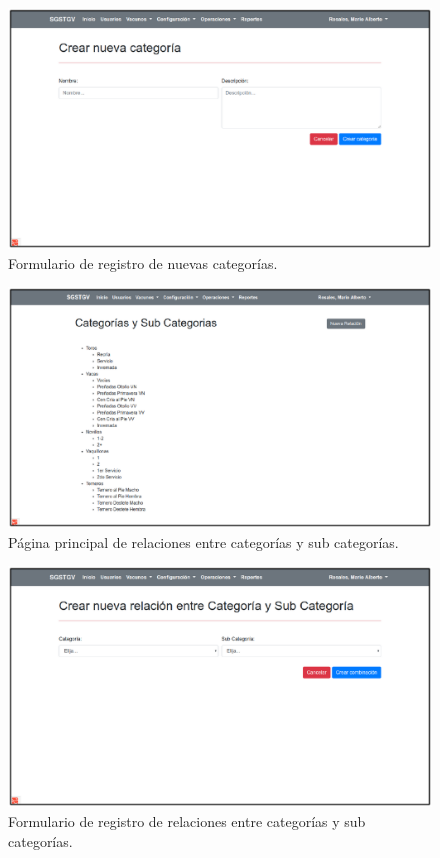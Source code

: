 \documentclass[11pt,oneside]{book}
\begin{document}
\begin{figure}[tbhp]
\centerline{\includegraphics[scale=0.87]{figs/capitulo_3_desarrollo/fig415.pdf}}
\caption{Formulario de registro de nuevas categorías.}
\label{fig415}
\end{figure}

\begin{figure}[tbhp]
\centerline{\includegraphics[scale=0.87]{figs/capitulo_3_desarrollo/fig416.pdf}}
\caption{Página principal de relaciones entre categorías y sub categorías.}
\label{fig416}
\end{figure}

\begin{figure}[tbhp]
\centerline{\includegraphics[scale=0.87]{figs/capitulo_3_desarrollo/fig417.pdf}}
\caption{Formulario de registro de relaciones entre categorías y sub categorías.}
\label{fig417}
\end{figure}
\end{document}
